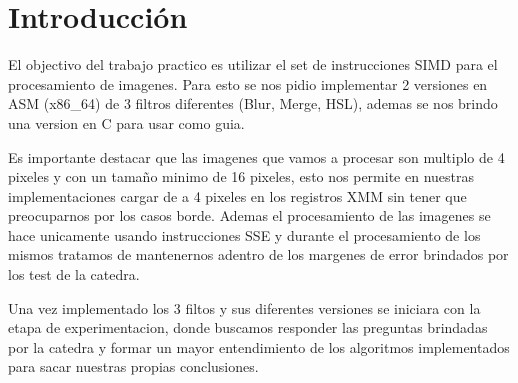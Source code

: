 \section{Introducción}

El objectivo del trabajo practico es utilizar el set de instrucciones SIMD para el procesamiento de imagenes.
Para esto se nos pidio implementar 2 versiones en ASM (x86\_64) de 3 filtros diferentes (Blur, Merge, HSL), ademas se nos brindo una version en C para usar como guia.

Es importante destacar que las imagenes que vamos a procesar son multiplo de 4 pixeles y con un tamaño minimo de 16 pixeles, esto nos permite en nuestras implementaciones cargar de a 4 pixeles en los registros XMM sin tener que preocuparnos por los casos borde.
Ademas el procesamiento de las imagenes se hace unicamente usando instrucciones SSE y durante el procesamiento de los mismos tratamos de mantenernos adentro de los margenes de error brindados por los test de la catedra.

Una vez implementado los 3 filtos y sus diferentes versiones se iniciara con la etapa de experimentacion, donde buscamos responder las preguntas brindadas por la catedra y formar un mayor entendimiento de los algoritmos implementados para sacar nuestras propias conclusiones.